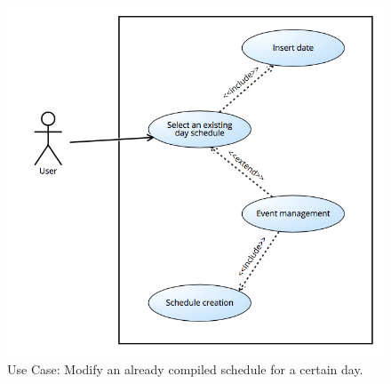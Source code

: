 \documentclass[numbers=noenddot, 12pt, a4paper, oneside]{scrbook}
\begin{document}
\begin{figure}[H]
	\includegraphics[width=1\textwidth]{usecases/Scenario7}
	\caption{Use Case: Modify an already compiled schedule for a certain day.}
\end{figure}
\end{document}
